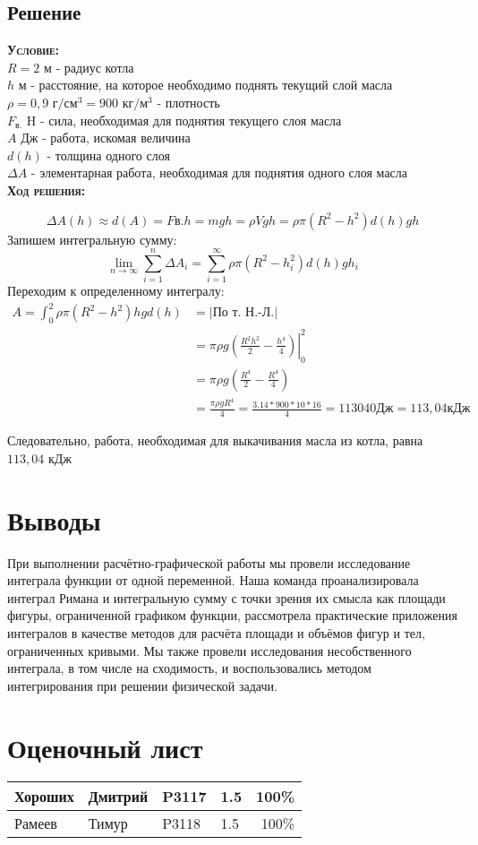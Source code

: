 \documentclass[12pt, a4paper]{article}
\begin{document}
\subsection{Решение}
\textsc{\textbf{Условие:}}\\
$R = 2$ м - радиус котла\\
$ h$ м - расстояние, на которое необходимо поднять текущий слой масла\\
$\rho = 0,9\text{ г}/\text{см}^3 = 900\text{ кг}/\text{м}^3$ - плотность\\
$ F_{\text{в.}} $ H - сила, необходимая для поднятия текущего слоя масла\\
$A$ Дж - работа, искомая величина\\
$d(h)$ - толщина одного слоя\\
$\Delta A$ - элементарная работа, необходимая для поднятия одного слоя масла\\
\newpage
\textsc{\textbf{Ход решения:}}

\begin{equation*}
\Delta A(h) \approx d(A) = F{\text{в.}} h = mgh = \rho Vgh =\rho \pi(R^2 - h^2)d(h) g h
\end{equation*}
Запишем интегральную сумму:
\begin{equation*}
\lim_{n\to \infty}\sum_{i = 1}^n \Delta A_i = \sum_{i = 1}^\infty \rho \pi (R^2 - h_i^2)d(h)gh_i
\end{equation*}
Переходим к определенному интегралу:
\begin{equation*}
\begin{aligned}
A = \int_{0}^{2} \rho \pi (R^{2} - h^{2} ) hg d(h) &= |\text{По т. Н.-Л.}|\\
&= \pi \rho g \left. \left( \frac{R^{2}h^{2} }{2} - \frac{h^{4} }{4} \right) \right|_{0}^{2} \\
&= \pi \rho g \left( \frac{R^{4} }{2} - \frac{R^{4} }{4} \right)\\
 &= \frac{ \pi \rho g R^{4} }{4} = \frac{3.14 * 900 * 10 * 16}{4} = 113 040\text{Дж} = 113,04\text{кДж}
 \end{aligned}
\end{equation*}

Следовательно, работа, необходимая для выкачивания масла из котла, равна $113,04$ кДж


\section{Выводы}
При выполнении расчётно-графической работы мы провели исследование интеграла функции от одной переменной. Наша команда проанализировала интеграл Римана и интегральную сумму с точки зрения их смысла как площади фигуры, ограниченной графиком функции, рассмотрела практические приложения интегралов в качестве методов для расчёта площади и объёмов фигур и тел, ограниченных кривыми. Мы также провели исследования несобственного интеграла, в том числе на сходимость, и воспользовались методом интегрирования при  решении физической задачи.
\newpage
\section{Оценочный лист}
\begin{center}
\large
\begin{tabular}{|l|l|l|l|r|}
\hline
Хороших & Дмитрий & P3117 & 1.5 & 100\%\\
\hline
Рамеев & Тимур & P3118 & 1.5  & 100\%\\
\hline
\end{tabular}
\end{center}
\end{document}
